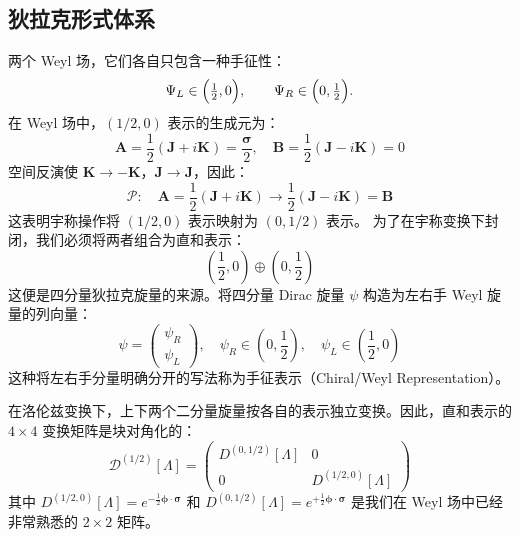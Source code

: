 \subsection{狄拉克形式体系 }
两个 Weyl 场，它们各自只包含一种手征性：
\[
\Psi_L\in\Bigl(\tfrac12,0\Bigr),\qquad
\Psi_R\in\Bigl(0,\tfrac12\Bigr).
\]
在 Weyl 场中，$(1/2, 0)$ 表示的生成元为：
\begin{equation}
    \boldsymbol{A} = \frac{1}{2}(\boldsymbol{J} + i\boldsymbol{K}) = \frac{\boldsymbol{\sigma}}{2}, \quad \boldsymbol{B} = \frac{1}{2}(\boldsymbol{J} - i\boldsymbol{K}) = 0
\end{equation}
空间反演使 $\boldsymbol{K} \to -\boldsymbol{K}$，$\boldsymbol{J} \to \boldsymbol{J}$，因此：
\begin{equation}
    \mathcal{P}: \quad \boldsymbol{A} = \frac{1}{2}(\boldsymbol{J} + i\boldsymbol{K}) \longrightarrow \frac{1}{2}(\boldsymbol{J} - i\boldsymbol{K}) = \boldsymbol{B}
\end{equation}
这表明宇称操作将 $(1/2, 0)$ 表示映射为 $(0, 1/2)$ 表示。
为了在宇称变换下封闭，我们必须将两者组合为直和表示：
\begin{equation}
    \left(\frac{1}{2}, 0\right) \oplus \left(0, \frac{1}{2}\right)
\end{equation}
这便是四分量狄拉克旋量的来源。将四分量 Dirac 旋量 $\psi$ 构造为左右手 Weyl 旋量的列向量：
\begin{equation}
    \psi = \begin{pmatrix} \psi_R \\ \psi_L \end{pmatrix}, \quad \psi_R \in \left(0, \frac{1}{2}\right), \quad \psi_L \in \left(\frac{1}{2}, 0\right)
\end{equation}
这种将左右手分量明确分开的写法称为手征表示（Chiral/Weyl Representation）。

在洛伦兹变换下，上下两个二分量旋量按各自的表示独立变换。因此，直和表示的 $4 \times 4$ 变换矩阵是块对角化的：
\begin{equation}
    \mathscr{D}^{(1/2)}[\Lambda] = \begin{pmatrix} D^{(0,1/2)}[\Lambda] & 0 \\ 0 & D^{(1/2,0)}[\Lambda] \end{pmatrix}
\end{equation}
其中 $D^{(1/2,0)}[\Lambda] = e^{-\frac{1}{2}\boldsymbol{\phi}\cdot\boldsymbol{\sigma}}$ 和 $D^{(0,1/2)}[\Lambda] = e^{+\frac{1}{2}\boldsymbol{\phi}\cdot\boldsymbol{\sigma}}$ 是我们在 Weyl 场中已经非常熟悉的 $2 \times 2$ 矩阵。

